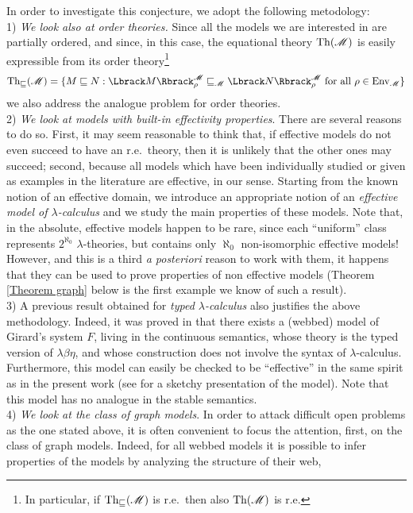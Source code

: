 \documentclass[english]{llncs}
\newcommand{\sqle}{\sqsubseteq}
\newcommand{\st}{:}
\newcommand{\Env}{\mathrm{Env}}
\newcommand{\lm}[1]{\mathscr{#1}} \newcommand{\Lint}[1]{\Lbrack #1\Rbrack} \newcommand{\ca}[1]{\mathscr{#1}} \newcommand{\Int}[1]{\vert #1\vert}
\newcommand{\gl}{\lambda}
\begin{document}
In order to investigate this conjecture, we adopt the following metodology:\\
1) {\em We look also at order theories.} Since all the models we are interested in are partially ordered, and since, in this case, 
the equational theory $\Th{\lm{M}}$ is easily expressible from its order theory\footnote{
In particular, if $\Thle{\lm{M}}$ is r.e.\ then also $\Th{\lm{M}}$ is r.e.
}
$$
    \Thle{\lm{M}} = \{ M \sqle N \st \Lint{M}^\lm{M}_\rho \sqle_{\lm{M}} \Lint{N}^\lm{M}_\rho \textrm{ for all }\rho\in\Env_{\lm{M}}\}
$$ 
we also address the analogue problem for order theories.\\
2) {\em We look at models with built-in effectivity properties}. 
There are several reasons to do so. 
First, it may seem reasonable to think that, if effective models do not even succeed to have an r.e.\ theory, then it is
unlikely that the other ones may succeed; second, because all models which have been individually studied or given as examples in the literature are effective, in our sense.
Starting from the known notion of an effective domain, we introduce an appropriate notion of an \emph{effective model of $\lambda$-calculus}
and we study the main properties of these models. 
Note that, in the absolute, effective models happen to be rare, since each ``uniform'' class represents
$2^{\aleph_{0}}$ $\gl$-theories, but contains only $\aleph_{0}$ non-isomorphic effective models! 
However, and this is a third \emph{a posteriori} reason to work with them, it happens that they can be used to prove 
properties of non effective models (Theorem \ref{Theorem graph} below is the first example we know of such a result).\\
3) A previous result obtained for \emph{typed $\lambda$-calculus} also justifies the above metho\-do\-logy. 
Indeed, it was proved in \cite{BerardiB02} that there exists a (webbed) model of Girard's system $F$, 
living in the continuous semantics, whose theory is the typed version of $\lambda\beta\eta$, and whose
construction does not involve the syntax of $\lambda$-calculus. 
Furthermore, this model can easily be checked to be ``effective'' in the same spirit as in
the present work (see \cite[Appendix C]{BerardiB02} for a sketchy presentation of the model). 
Note that this model has no analogue in the stable semantics.\\
4) \emph{We look at the class of graph models}. 
In order to attack difficult open problems as the one stated above, it is often convenient to focus the attention, first, on the class of graph models.
Indeed, for all webbed models it is possible to infer properties of the models by analyzing the structure of their web, 
\end{document}
